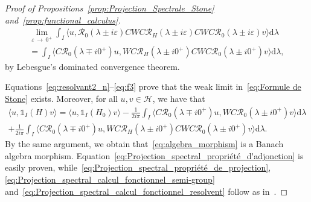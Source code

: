 \documentclass[10pt]{amsart}
\theoremstyle{definition}\newtheorem{defi}[theo]{Definition}\newtheorem{rema}[theo]{Remark}\newtheorem{exam}[theo]{Example}\newtheorem{exem}[theo]{Example}\newtheorem{nota}[theo]{Notation}
\newcommand{\Hi}{\mathcal{H}}
\newcommand{\rmd}{\mathrm{d}}
\newcommand{\Res}{\mathcal{R}}
\begin{document}
\begin{proof}[Proof of Propositions~\ref{prop:Projection_Spectrale_Stone} and~\ref{prop:functional_calculus}]
\begin{multline}\label{eq:f3}
\lim_{\varepsilon\,\rightarrow\,0^+} \int_I \Big \langle u, \Res_0(\lambda\pm i\varepsilon)CWC\Res_H(\lambda\pm i\varepsilon)CWC\Res_0(\lambda\pm i\varepsilon) v \Big \rangle \rmd \lambda\\
= \int_I \Big \langle C \Res_0(\lambda\mp i0^+) u, WC\Res_H(\lambda\pm i0^+)CWC\Res_0(\lambda\pm i0^+) v \Big \rangle \rmd \lambda, 
\end{multline}
by Lebesgue's dominated convergence theorem.

Equations~\eqref{eq:resolvant2_n}--\eqref{eq:f3} prove that the weak limit in~\eqref{eq:Formule de Stone} exists. Moreover, for all $u,v\in\Hi$, we have that
\begin{multline*}
\langle u, \mathds{1}_I(H) v\rangle = \langle u, \mathds{1}_I(H_0) v\rangle - \frac{1}{2i\pi} \int_I \big \langle C \Res_{0}\left(\lambda\mp i0^+\right) u, WC\Res_{0}\left(\lambda\pm i0^+\right) v \big \rangle \rmd \lambda \\
+ \frac{1}{2i\pi} \int_I \Big \langle C \Res_0\left(\lambda\mp i0^+\right) u, WC\Res_H\left(\lambda\pm i0^+\right)CWC\Res_0\left(\lambda\pm i0^+\right) v \Big \rangle \rmd \lambda.
\end{multline*}
By the same argument, we obtain that~\eqref{eq:algebra_morphism} is a Banach algebra morphism. Equation~\eqref{eq:Projection_spectral_propriété_d'adjonction} is easily proven, while~\eqref{eq:Projection_spectral_propriété_de_projection}, \eqref{eq:Projection_spectral_calcul_fonctionnel_semi-group} and~\eqref{eq:Projection_spectral_calcul_fonctionnel_resolvent} follow as in~\cite{FaFr18_01}.
\end{proof}
\end{document}
